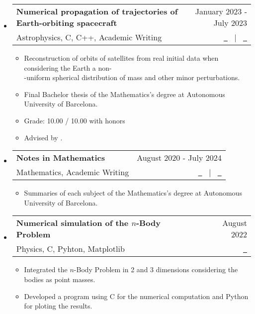 \documentclass[a4paper,11pt]{article}
\makeatletter
\newcommand{\resumeItemListEnd}{\end{itemize}}
\newcommand{\resumeQuadHeading}[4]{
  \item
  \begin{tabular*}{0.96\textwidth}[t]{l@{\extracolsep{\fill}}r}
    \textbf{#1} & \small #2 \\
    \small#3 & \small #4 \\
  \end{tabular*}
}
\newcommand{\resumeHeadingListStart}{
  \begin{itemize}[leftmargin=0.15in, label={}]
}
\newcommand{\resumeHeadingListEnd}{\end{itemize}}
\makeatother
\begin{document}
\begin{itemize}[leftmargin=3em, itemsep=0.1em, topsep=2pt]
\resumeHeadingListStart{}
\resumeQuadHeading{Numerical propagation of trajectories of Earth-orbiting spacecraft}{January 2023 - July 2023}{Astrophysics, C, C++, Academic Writing}{\href{https://github.com/victorballester7/final-bachelor-thesis/releases/latest/download/main.pdf}{\faFileTextO \ \graydotuline{Report}} \ $|$ \ \href{https://github.com/victorballester7/final-bachelor-thesis}{\faGithub \ \graydotuline{Code}}}
\begin{itemize}[leftmargin=3em, itemsep=0.1em, topsep=2pt]
	\item \small Reconstruction of orbits of satellites from real initial data when considering the Earth a non-\\-uniform spherical distribution of mass and other minor perturbations.
	\item \small Final Bachelor thesis of the Mathematics's degree at Autonomous University of Barcelona.
	\item Grade: 10.00 / 10.00 with honors
	\item \small Advised by \href{http://www.gsd.uab.es/people?controller=member&view=member&id=9&slug=josep-maria}{}.
\end{itemize}
\resumeHeadingListEnd{}

\resumeHeadingListStart{}
\resumeQuadHeading{Notes in Mathematics}{August 2020 - July 2024}{Mathematics, Academic Writing}{\href{https://victorballester7.github.io/complete-summaries/}{\faGlobe \ \graydotuline{Website}} \ $|$ \ \href{https://github.com/victorballester7/complete-summaries}{\faGithub \ \graydotuline{Code}}}
\begin{itemize}[leftmargin=3em, itemsep=0.1em, topsep=2pt]
	\item \small Summaries of each subject of the Mathematics's degree at Autonomous University of Barcelona.
\end{itemize}
\resumeItemListEnd{}

\resumeHeadingListStart{}
\resumeQuadHeading{Numerical simulation of the $n$-Body Problem}{August 2022}{Physics, C, Pyhton, Matplotlib}{\href{https://github.com/victorballester7/n-body_problem}{\faGithub \ \graydotuline{Code}}}
\begin{itemize}[leftmargin=3em, itemsep=0.1em, topsep=2pt]
	\item \small Integrated the $n$-Body Problem in 2 and 3 dimensions considering the bodies as point masses.
	\item \small Developed a program using C for the numerical computation and Python for ploting the results.
\end{itemize}
\resumeHeadingListEnd{}


\end{itemize}
\end{document}
